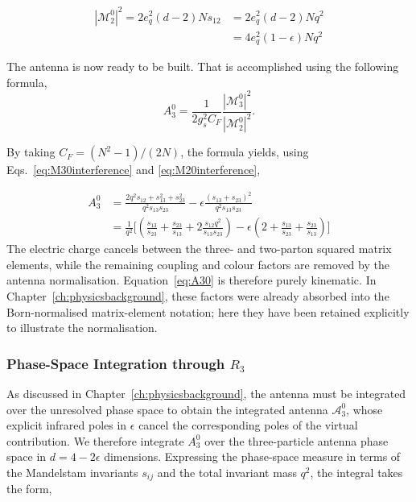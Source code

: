 \begin{equation}\label{eq:M20interference}
    \begin{split}
        |\mathcal M_2^0|^2 = 2e_q^2(d-2)Ns_{12} &= 2e_q^2(d-2)Nq^2\\
                                                       &= 4e_q^2(1-\epsilon)Nq^2
    \end{split}
\end{equation}


The antenna is now ready to be built. That is accomplished using the following formula,
\begin{equation}
    A_3^0 = \frac1{2g_s^2C_F}\frac{|\mathcal M_3^0|^2}{|\mathcal M_2^0|^2}.
\end{equation}

By taking $C_F = (N^2-1)/(2N)$, the formula yields, using Eqs.~\eqref{eq:M30interference} and \eqref{eq:M20interference},

\begin{equation}\label{eq:A30}
    \begin{split}
        A_3^0 &= \frac{2q^2s_{12}+s_{13}^2+s_{23}^2}{q^2s_{13}s_{23}}-\epsilon\frac{(s_{13}+s_{23})^2}{q^2s_{13}s_{23}}\\
              &= \frac1{q^2}\Bigg[\left(\frac{s_{13}}{s_{23}}+\frac{s_{23}}{s_{13}}+2\frac{s_{12}q^2}{s_{13}s_{23}}\right)-\epsilon\left(2+\frac{s_{13}}{s_{23}}+\frac{s_{23}}{s_{13}}\right)\Bigg]
    \end{split}
\end{equation}
The electric charge cancels between the three- and two-parton squared matrix elements, while the
remaining coupling and colour factors are removed by the antenna normalisation. Equation~\eqref{eq:A30}
is therefore purely kinematic. In Chapter~\ref{ch:physicsbackground}, these factors were already
absorbed into the Born-normalised matrix-element notation; here they have been retained explicitly to
illustrate the normalisation.


\subsubsection*{Phase-Space Integration through $R_3$}

As discussed in Chapter~\ref{ch:physicsbackground}, the antenna must be integrated over the unresolved
phase space to obtain the integrated antenna $\mathcal A_3^0$, whose explicit infrared poles in
$\epsilon$ cancel the corresponding poles of the virtual contribution. We therefore integrate $A_3^0$
over the three-particle antenna phase space in $d=4-2\epsilon$ dimensions. Expressing the phase-space
measure in terms of the Mandelstam invariants $s_{ij}$ and the total invariant mass $q^2$, the
integral takes the form,


